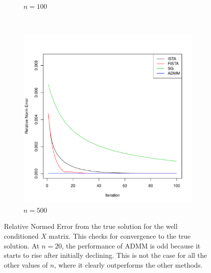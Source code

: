 \documentclass[12pt, leqno]{article}
\theoremstyle{remark}
\begin{document}
\begin{figure}[H]
\begin{subfigure}[b]{0.4\textwidth}
        \caption{$n=100$}
        \label{fig:100}
    \end{subfigure}
~
    \begin{subfigure}[b]{0.4\textwidth}
        \includegraphics[width=\textwidth]{500cvgc2.pdf}
        \caption{$n=500$}
        \label{fig:500}
    \end{subfigure}
\caption{Relative Normed Error from the true solution for the well conditioned $X$ matrix. This checks for convergence to the true solution. At $n=20$, the performance of ADMM is odd because it starts to rise after initially declining. This is not the case for all the other values of $n$, where it clearly outperforms the other methods.}
\label{fig:cvgc2}
\end{figure}
\end{document}
